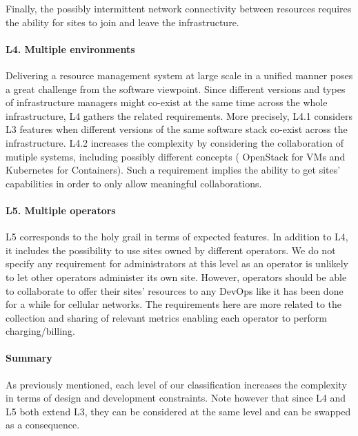 Finally, the possibly intermittent network connectivity between \edge resources
requires the ability for sites to join and leave the
infrastructure.


\vspace*{-.3cm}
\paragraph{L4. Multiple \cloud environments}
Delivering a resource management system at large scale in a unified manner %
poses a great challenge from the software viewpoint. Since different versions and types
of infrastructure managers might co-exist at the same time across the whole
infrastructure, L4 gathers the related requirements.
%
More precisely, L4.1 considers L3 features when different versions of the same software stack co-exist across the infrastructure.
%
L4.2 increases the complexity by considering  the collaboration of mutiple systems, including possibly different concepts (\eg
OpenStack for VMs and Kubernetes for Containers).
%
Such a requirement implies the ability to get sites' capabilities in order to
only allow meaningful collaborations.

\vspace*{-.3cm}
\paragraph{L5. Multiple operators}
L5 corresponds to the holy grail in terms of expected features. In addition to
L4, it includes the possibility to use sites owned by different operators. %
We do not specify any requirement for
administrators at this level as an operator is unlikely to let other operators administer
its own site. However, operators should be able to collaborate to offer their
sites' resources to any DevOps like it has been done for a while for cellular
networks. The requirements here are more related to the collection and sharing of
relevant metrics enabling each operator to perform charging/billing.

\vspace*{-.3cm}
\paragraph{Summary}
As previously mentioned, each level of our classification increases the
complexity in terms of design and development constraints. Note however that
since L4 and L5 both extend L3, they can be considered at the same level and
can be swapped as a consequence.

